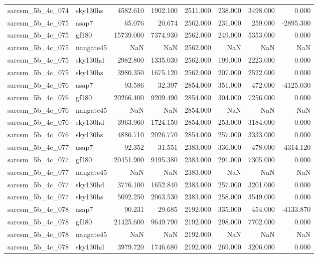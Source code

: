 \begin{tabular}{llrrrrrr}
sarcsm\_5b\_4c\_074 & sky130hs & 4582.610 & 1902.100 & 2511.000 & 238.000 & 3498.000 & 0.000 \\
sarcsm\_5b\_4c\_075 & asap7 & 65.076 & 20.674 & 2562.000 & 231.000 & 259.000 & -2895.300 \\
sarcsm\_5b\_4c\_075 & gf180 & 15739.000 & 7374.930 & 2562.000 & 249.000 & 5353.000 & 0.000 \\
sarcsm\_5b\_4c\_075 & nangate45 & NaN & NaN & 2562.000 & NaN & NaN & NaN \\
sarcsm\_5b\_4c\_075 & sky130hd & 2982.800 & 1335.030 & 2562.000 & 199.000 & 2223.000 & 0.000 \\
sarcsm\_5b\_4c\_075 & sky130hs & 3980.350 & 1675.120 & 2562.000 & 207.000 & 2522.000 & 0.000 \\
sarcsm\_5b\_4c\_076 & asap7 & 93.586 & 32.397 & 2854.000 & 351.000 & 472.000 & -4125.030 \\
sarcsm\_5b\_4c\_076 & gf180 & 20266.400 & 9209.490 & 2854.000 & 304.000 & 7256.000 & 0.000 \\
sarcsm\_5b\_4c\_076 & nangate45 & NaN & NaN & 2854.000 & NaN & NaN & NaN \\
sarcsm\_5b\_4c\_076 & sky130hd & 3963.960 & 1724.150 & 2854.000 & 253.000 & 3184.000 & 0.000 \\
sarcsm\_5b\_4c\_076 & sky130hs & 4886.710 & 2026.770 & 2854.000 & 257.000 & 3333.000 & 0.000 \\
sarcsm\_5b\_4c\_077 & asap7 & 92.352 & 31.551 & 2383.000 & 336.000 & 478.000 & -4314.120 \\
sarcsm\_5b\_4c\_077 & gf180 & 20451.900 & 9195.380 & 2383.000 & 291.000 & 7305.000 & 0.000 \\
sarcsm\_5b\_4c\_077 & nangate45 & NaN & NaN & 2383.000 & NaN & NaN & NaN \\
sarcsm\_5b\_4c\_077 & sky130hd & 3776.100 & 1652.840 & 2383.000 & 257.000 & 3201.000 & 0.000 \\
sarcsm\_5b\_4c\_077 & sky130hs & 5092.250 & 2063.530 & 2383.000 & 258.000 & 3549.000 & 0.000 \\
sarcsm\_5b\_4c\_078 & asap7 & 90.231 & 29.685 & 2192.000 & 335.000 & 454.000 & -4133.870 \\
sarcsm\_5b\_4c\_078 & gf180 & 21425.600 & 9649.790 & 2192.000 & 298.000 & 7702.000 & 0.000 \\
sarcsm\_5b\_4c\_078 & nangate45 & NaN & NaN & 2192.000 & NaN & NaN & NaN \\
sarcsm\_5b\_4c\_078 & sky130hd & 3979.720 & 1746.680 & 2192.000 & 269.000 & 3206.000 & 0.000 \\

\end{tabular}
